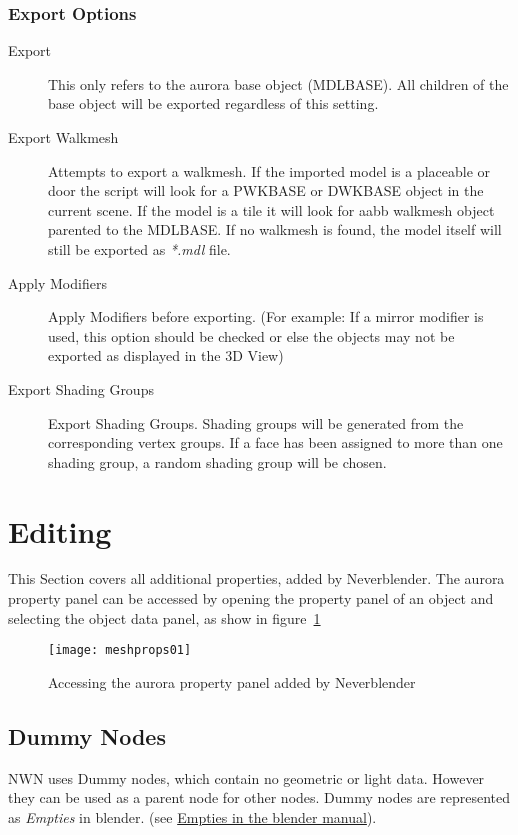 \documentclass[a4paper]{article}
\begin{document}
\subsubsection*{Export Options}
\begin{description}
    \item[Export] This only refers to the aurora base object (MDLBASE). All children of the base object will be exported regardless of this setting.
    \item[Export Walkmesh] Attempts to export a walkmesh. If the imported model is a placeable or door the script will look for a PWKBASE or DWKBASE object in the current scene. If the model is a tile it will look for aabb walkmesh object parented to the MDLBASE. If no walkmesh is found, the model itself will still be exported as {\textit{*.mdl }} file.
    \item[Apply Modifiers] Apply Modifiers before exporting. (For example: If a mirror modifier is used, this option should be checked or else the objects may not be exported as displayed in the 
3D View)
    \item[Export Shading Groups] Export Shading Groups. Shading groups will be generated from the corresponding vertex groups. If a face has been assigned to more than one shading group, a random  shading group will be chosen. 
\end{description}

\section{Editing}
This Section covers all additional properties, added by Neverblender. The aurora property panel can be accessed by opening the property panel of an object and selecting the object data panel, as show in figure~\ref{fig:meshprops01}

\begin{figure}
  \centering
  \texttt{[image: meshprops01]}
  \caption[mdl import]{Accessing the aurora property panel added by Neverblender}
  \label{fig:meshprops01}
\end{figure}

\subsection{Dummy Nodes}
NWN uses Dummy nodes, which contain no geometric or light data. However they can be used as a parent node for other nodes. Dummy nodes are represented as {\textit{Empties}} in blender. (see  \hyperref{http://wiki.blender.org/index.php/Doc:2.6/Manual/Modeling/Empties}{}{}{Empties in the blender manual}).
\end{document}
